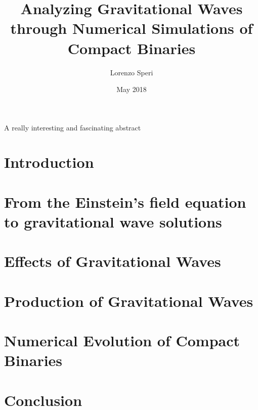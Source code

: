 \documentclass[twoside,english, a4paper, 12pt]{shared/uiofysmaster}
\author{Lorenzo Speri}
\title{\bf{Analyzing Gravitational Waves through Numerical Simulations of Compact Binaries}}
\date{May 2018}
\begin{document}

\maketitle
\clearpage

\tableofcontents
\clearpage

\begin{abstract1}
A really interesting and fascinating abstract
\end{abstract1}

\clearpage
\section{Introduction}


\clearpage
\section{From the Einstein's field equation\\ to gravitational wave solutions}
\label{from_equation_to_solution}


\clearpage
\section{Effects of Gravitational Waves}
\label{effects_gw}


\clearpage
\section{Production of Gravitational Waves}
\label{production_gw}


\clearpage
\section{Numerical Evolution of Compact Binaries}
\label{numerical_evolution}


\clearpage
\section{Conclusion}





%

%
\clearpage
\printbibliography


\end{document}
